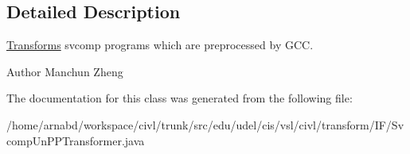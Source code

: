 \subsection{Detailed Description}
\hyperlink{classedu_1_1udel_1_1cis_1_1vsl_1_1civl_1_1transform_1_1IF_1_1Transforms}{Transforms} svcomp programs which are preprocessed by G\+C\+C. 

\begin{DoxyAuthor}{Author}
Manchun Zheng 
\end{DoxyAuthor}


The documentation for this class was generated from the following file\+:\begin{DoxyCompactItemize}
\item 
/home/arnabd/workspace/civl/trunk/src/edu/udel/cis/vsl/civl/transform/\+I\+F/Svcomp\+Un\+P\+P\+Transformer.\+java\end{DoxyCompactItemize}
